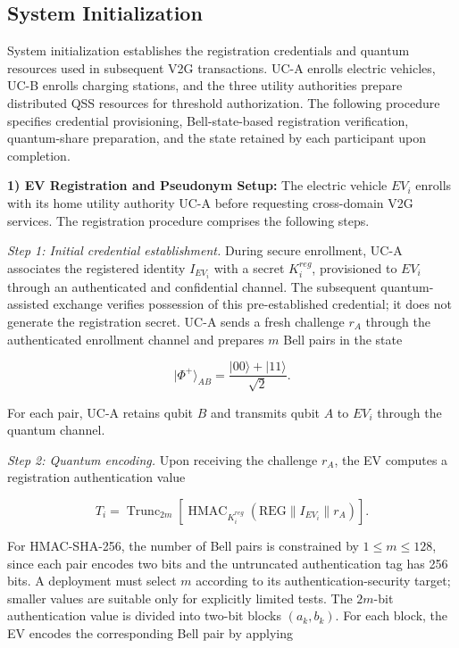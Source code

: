 \documentclass[twocolumn,10pt,journal]{IEEEtran}
\begin{document}
\subsection{System Initialization}
\label{subsec:qsv2g_initialization}
System initialization establishes the registration credentials
and quantum resources used in subsequent V2G transactions.
UC-A enrolls electric vehicles, UC-B enrolls charging stations,
and the three utility authorities prepare distributed QSS
resources for threshold authorization. The following procedure
specifies credential provisioning, Bell-state-based registration
verification, quantum-share preparation, and the state retained
by each participant upon completion.

\noindent\textbf{1) EV Registration and Pseudonym Setup:}
The electric vehicle $EV_i$ enrolls with its home utility
authority UC-A before requesting cross-domain V2G services.
The registration procedure comprises the following steps.

\textit{Step 1: Initial credential establishment.}
During secure enrollment, UC-A associates the registered
identity $I_{EV_i}$ with a secret $K_i^{reg}$, provisioned
to $EV_i$ through an authenticated and confidential channel.
The subsequent quantum-assisted exchange verifies possession
of this pre-established credential; it does not generate the
registration secret. UC-A sends a fresh challenge $r_A$
through the authenticated enrollment channel and prepares $m$
Bell pairs in the state

\begin{equation}
|\Phi^{+}\rangle_{AB}
=
\frac{|00\rangle+|11\rangle}{\sqrt{2}}.
\label{eq:ev_reg_bell}
\end{equation}

For each pair, UC-A retains qubit $B$ and transmits
qubit $A$ to $EV_i$ through the quantum channel.

\textit{Step 2: Quantum encoding.}
Upon receiving the challenge $r_A$, the EV computes
a registration authentication value

\begin{equation}
T_i =
\operatorname{Trunc}_{2m}
\left[
\operatorname{HMAC}_{K_i^{reg}}
\left(
\mathrm{REG}\parallel I_{EV_i}\parallel r_A
\right)
\right].
\label{eq:ev_reg_tag}
\end{equation}

For HMAC-SHA-256, the number of Bell pairs is constrained by
$1\leq m\leq128$, since each pair encodes two bits and the
untruncated authentication tag has 256 bits. A deployment must
select $m$ according to its authentication-security target;
smaller values are suitable only for explicitly limited tests.
The $2m$-bit authentication value is divided into
two-bit blocks $(a_k,b_k)$. For each block, the EV
encodes the corresponding Bell pair by applying
\end{document}
